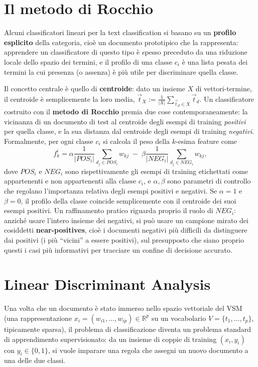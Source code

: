 \documentclass[11pt,a4paper]{report}
\begin{document}
\section{Il metodo di Rocchio}

Alcuni classificatori lineari per la text classification si basano su un \textbf{profilo esplicito} della categoria, cioè un documento prototipico che la rappresenta: apprendere un classificatore di questo tipo è spesso preceduto da una riduzione locale dello spazio dei termini, e il profilo di una classe $c_i$ è una lista pesata dei termini la cui presenza (o assenza) è più utile per discriminare quella classe.

Il concetto centrale è quello di \textbf{centroide}: dato un insieme $X$ di vettori-termine, il centroide è semplicemente la loro media, $\vec{t}_X := \frac{1}{|X|}\sum_{\vec{t}_d \in X} \vec{t}_d$. Un classificatore costruito con il \textbf{metodo di Rocchio} premia due cose contemporaneamente: la vicinanza di un documento di test al centroide degli esempi di training \emph{positivi} per quella classe, e la sua distanza dal centroide degli esempi di training \emph{negativi}. Formalmente, per ogni classe $c_i$ si calcola il peso della $k$-esima feature come
\[
f_k^i = \alpha \frac{1}{|POS_i|}\sum_{d_j \in POS_i} w_{kj} \;-\; \beta \frac{1}{|NEG_i|}\sum_{d_j \in NEG_i} w_{kj},
\]
dove $POS_i$ e $NEG_i$ sono rispettivamente gli esempi di training etichettati come appartenenti e non appartenenti alla classe $c_i$, e $\alpha,\beta$ sono parametri di controllo che regolano l'importanza relativa degli esempi positivi e negativi. Se $\alpha=1$ e $\beta=0$, il profilo della classe coincide semplicemente con il centroide dei suoi esempi positivi. Un raffinamento pratico riguarda proprio il ruolo di $NEG_i$: anziché usare l'intero insieme dei negativi, si può usare un campione mirato dei cosiddetti \textbf{near-positives}, cioè i documenti negativi più difficili da distinguere dai positivi (i più ``vicini'' a essere positivi), sul presupposto che siano proprio questi i casi più informativi per tracciare un confine di decisione accurato.

\section{Linear Discriminant Analysis}

Una volta che un documento è stato immerso nello spazio vettoriale del VSM (una rappresentazione $x_i = (w_{i1},\ldots,w_{ip}) \in \mathbb{R}^p$ su un vocabolario $V=\{t_1,\ldots,t_p\}$, tipicamente sparsa), il problema di classificazione diventa un problema standard di apprendimento supervisionato: da un insieme di coppie di training $(x_i,y_i)$ con $y_i \in \{0,1\}$, si vuole imparare una regola che assegni un nuovo documento a una delle due classi.
\end{document}
